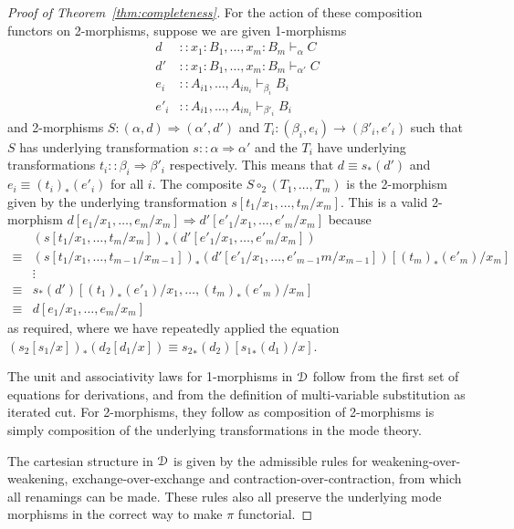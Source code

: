 \documentclass[a4paper,USenglish,numberwithinsect]{lipics-v2016}
\newcommand\D{\ensuremath{d}} %
\newcommand\deq{\ensuremath{\equiv}}
\newcommand\spr{\ensuremath{\Rightarrow}} %
\newcommand\seq[3]{\ensuremath{#1 \vdash_{#2} #3}}
\renewcommand\subst[3]{\ensuremath{#1[#2/#3]}}
\newcommand\comph[2]{\ensuremath{#1 \mathbin{\circ_2} #2}}
\newcommand\Trd[2]{\ensuremath{#1_*(#2)}}
\newcommand\Cut[3]{\ensuremath{#1[#2/#3]}}
\begin{document}
\begin{proof}[Proof of Theorem~\ref{thm:completeness}]
For the action of these composition functors on 2-morphisms, suppose we are given 1-morphisms 
\begin{align*}
d &:: \seq{x_1 : B_1, \dots, x_m : B_m}{\alpha}{C} \\
d' &:: \seq{x_1 : B_1, \dots, x_m : B_m}{\alpha'}{C} \\
e_i &:: \seq{A_{i1}, \dots, A_{in_i}}{\beta_i}{B_i} \\
e'_i &:: \seq{A_{i1}, \dots, A_{in_i}}{\beta'_i}{B_i} 
\end{align*}
and 2-morphisms $S : (\alpha, d) \spr (\alpha', d')$ and $T_i :
(\beta_i, e_i) \to (\beta'_i, e'_i)$ such that $S$ has underlying
transformation $s :: \alpha \spr \alpha'$ and the $T_i$ have underlying
transformations $t_i :: \beta_i \spr \beta'_i$ respectively. This means
that $d \deq s_*(d')$ and $e_i \deq (t_i)_*(e'_i)$ for all $i$. The
composite $\comph{S}{(T_1, \dots, T_m)}$ is the 2-morphism given by the
underlying transformation $s[t_1/x_1, \dots, t_m/x_m]$. This is a valid
2-morphism $d[e_1/x_1, \dots, e_m/x_m] \spr d'[e'_1/x_1, \dots, e'_m/x_m]$ because
\begin{align*}
& (s[t_1/x_1, \dots, t_m/x_m])_*(d'[e'_1/x_1, \dots, e'_m/x_m]) \\
\deq & (s[t_1/x_1, \dots, t_{m-1}/x_{m-1}])_*(d'[e'_1/x_1, \dots, e'_{m-1}m/x_{m-1}])[(t_m)_*(e'_m)/x_m] \\
& \vdots \\
\deq & s_*(d')[(t_1)_*(e'_1)/x_1, \dots, (t_m)_*(e'_m)/x_m] \\
\deq & d[e_1/x_1, \dots, e_m/x_m]
\end{align*}
as required, where we have repeatedly applied the equation $\Trd{(\subst{s_2}{s_1}{x})}{\Cut{\D_2}{\D_1}{x}} \deq \Cut{\Trd{{s_2}}{\D_2}}{\Trd{{s_1}}{\D_1}}{x}$.

The unit and associativity laws for 1-morphisms in $\mathcal{D}$ follow from the
first set of equations for derivations, and from the definition of
multi-variable substitution as iterated cut.  For 2-morphisms, they
follow as composition of 2-morphisms is simply composition of the
underlying transformations in the mode theory.

The cartesian structure in $\mathcal{D}$ is given by the admissible rules for
weakening-over-weakening, exchange-over-exchange and
contraction-over-contraction, from which all renamings can be
made. These rules also all preserve the underlying mode morphisms in the
correct way to make $\pi$ functorial.


\end{proof}
\end{document}
